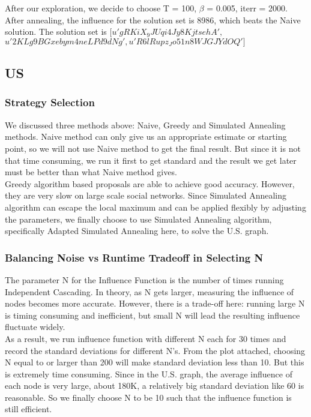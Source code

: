 \documentclass{article}
\begin{document}
After our exploration, we decide to choose T = 100,  $\beta$ = 0.005, iterr = 2000.
After annealing, the influence for the solution set is 8986, which beats the Naive solution. The solution set is $[u'gRKiX_9JUqi4Jy8KjtsehA',$\\
$u'2KLg9BGxebym4neLPd9dNg', u'R6lRupz_Jo51n8WJGJYdOQ']$

\FloatBarrier
\subsection{US}%


\FloatBarrier
\subsubsection{Strategy Selection}   %

We discussed three methods above: Naive, Greedy and Simulated Annealing methods. Naive method can only give us an appropriate estimate or starting point, so we will not use Naive method to get the final result. But since it is not that time consuming, we run it first to get standard and the result we get later must be better than what Naive method gives. \\
Greedy algorithm based proposals are able to achieve good accuracy. However, they are very slow on large scale social networks. Since Simulated Annealing algorithm can escape the local maximum and can be applied flexibly by adjusting the parameters, we finally choose to use Simulated Annealing algorithm, specifically Adapted Simulated Annealing here, to solve the U.S. graph.


\FloatBarrier
\subsubsection{Balancing Noise vs Runtime Tradeoff in Selecting N}%

The parameter N for the Influence Function is the number of times running Independent Cascading. In theory, as N gets larger, measuring the influence of nodes becomes more accurate. However, there is a trade-off here: running large N is timing consuming and inefficient, but small N will lead the resulting influence fluctuate widely. \\ 
As a result, we run influence function with different N each for 30 times and record the standard deviations for different N's. From the plot attached, choosing N equal to or larger than 200 will make standard deviation less than 10. But this is extremely time consuming. Since in the U.S. graph, the average influence of each node is very large, about 180K, a relatively big standard deviation like 60 is reasonable. So we finally choose N to be 10 such that the influence function is still efficient.
\end{document}
